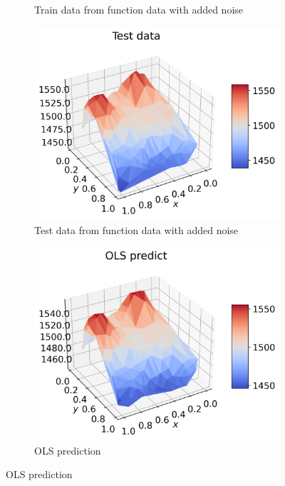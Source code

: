 \documentclass[12pt]{article}
\begin{document}
\begin{figure}[H]
\begin{subfigure}{.5\textwidth}
    \caption{Train data from function data with added noise}
    \label{fig:real_pred_train_skip}
  \end{subfigure}
  \begin{subfigure}{.5\textwidth}
    \centering
    \includegraphics[width=\textwidth]{../figures/test_data_n40_skip2.png}
    \caption{Test data from function data with added noise}
    \label{fig:real_pred_test_skip}
  \end{subfigure}
  \begin{subfigure}{.5\textwidth}
    \centering
    \includegraphics[width=\textwidth]{../figures/ols_pred_n40_skip2.png}
    \caption{OLS prediction}

\end{subfigure}
\end{figure}
\end{document}
